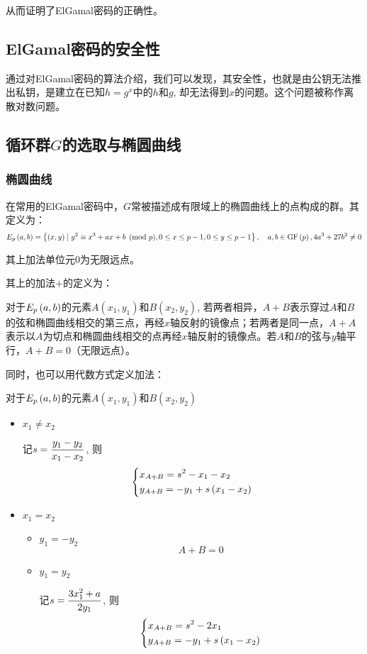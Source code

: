 从而证明了ElGamal密码的正确性。
\subsection{ElGamal密码的安全性}
通过对ElGamal密码的算法介绍，我们可以发现，其安全性，也就是由公钥无法推出私钥，是建立在已知$h=g^x$中的$h$和$g$, 却无法得到$x$的问题。这个问题被称作离散对数问题。
\subsection{循环群$G$的选取与椭圆曲线}
\subsubsection{椭圆曲线}
在常用的ElGamal密码中，$G$常被描述成有限域上的椭圆曲线上的点构成的群。其定义为：
\begin{equation}
E_p\left( {a, b}\right)=\left\{ {\left( {x, y}\right)\mid y^2\equiv x^3+ax+b\pmod{p}, 0\leq x\leq p-1, 0\leq y\leq p-1} \right\},\quad a,b\in\mathrm{GF}\left( {p}\right), 4a^3+27b^2\neq 0
\end{equation}

其上加法单位元$0$为无限远点。\par
其上的加法$+$的定义为：\par
对于$E_p\left( {a, b}\right)$的元素$A(x_1, y_1)$和$B(x_2, y_2)$, 若两者相异，$A+B$表示穿过$A$和$B$的弦和椭圆曲线相交的第三点，再经$x$轴反射的镜像点；若两者是同一点，$A+A$表示以$A$为切点和椭圆曲线相交的点再经$x$轴反射的镜像点。若$A$和$B$的弦与$y$轴平行，$A+B=0$（无限远点）。\par
同时，也可以用代数方式定义加法：\par
对于$E_p\left( {a, b}\right)$的元素$A(x_1, y_1)$和$B(x_2, y_2)$
\begin{itemize}
	\item $x_1\neq x_2$\par
	记$\displaystyle s=\frac{y_1-y_2}{x_1-x_2}$, 则
	\begin{equation}
	\begin{dcases}x_{A+B}=s^2-x_1-x_2\\y_{A+B}=-y_1+s\left( {x_1-x_2}\right)\end{dcases}
	\end{equation}
	\item $x_1=x_2$
	\begin{itemize}
		\item $y_1=-y_2$
		\[A+B=0\]
		\item $y_1=y_2$\par
		记$\displaystyle s=\frac{3x_1^2+a}{2y_1}$, 则
		\begin{equation}
		\begin{dcases}x_{A+B}=s^2-2x_1\\y_{A+B}=-y_1+s\left( {x_1-x_2}\right)\end{dcases}
		\end{equation}
	\end{itemize}
\end{itemize}

